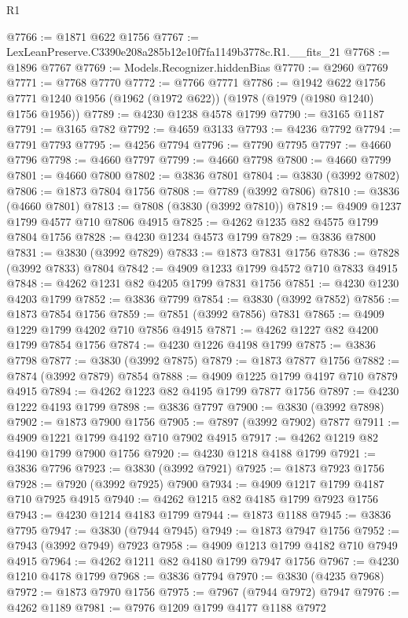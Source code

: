 \begin{lexlean}{R1}
\begin{coremodule}
@7766 := @1871 @622 @1756
@7767 := LexLeanPreserve.C3390e208a285b12e10f7fa1149b3778c.R1.__fits_21
@7768 := @1896 @7767
@7769 := Models.Recognizer.hiddenBias
@7770 := @2960 @7769
@7771 := @7768 @7770
@7772 := @7766 @7771
@7786 := @1942
    @622
    @1756
    @7771
    @1240
    @1956
    (@1962 (@1972 @622))
    (@1978 (@1979 (@1980 @1240) @1756 @1956))
@7789 := @4230 @1238 @4578 @1799
@7790 := @3165 @1187
@7791 := @3165 @782
@7792 := @4659 @3133
@7793 := @4236 @7792
@7794 := @7791 @7793
@7795 := @4256 @7794
@7796 := @7790 @7795
@7797 := @4660 @7796
@7798 := @4660 @7797
@7799 := @4660 @7798
@7800 := @4660 @7799
@7801 := @4660 @7800
@7802 := @3836 @7801
@7804 := @3830 (@3992 @7802)
@7806 := @1873 @7804 @1756
@7808 := @7789 (@3992 @7806)
@7810 := @3836 (@4660 @7801)
@7813 := @7808 (@3830 (@3992 @7810))
@7819 := @4909 @1237 @1799 @4577 @710 @7806 @4915
@7825 := @4262 @1235 @82 @4575 @1799 @7804 @1756
@7828 := @4230 @1234 @4573 @1799
@7829 := @3836 @7800
@7831 := @3830 (@3992 @7829)
@7833 := @1873 @7831 @1756
@7836 := @7828 (@3992 @7833) @7804
@7842 := @4909 @1233 @1799 @4572 @710 @7833 @4915
@7848 := @4262 @1231 @82 @4205 @1799 @7831 @1756
@7851 := @4230 @1230 @4203 @1799
@7852 := @3836 @7799
@7854 := @3830 (@3992 @7852)
@7856 := @1873 @7854 @1756
@7859 := @7851 (@3992 @7856) @7831
@7865 := @4909 @1229 @1799 @4202 @710 @7856 @4915
@7871 := @4262 @1227 @82 @4200 @1799 @7854 @1756
@7874 := @4230 @1226 @4198 @1799
@7875 := @3836 @7798
@7877 := @3830 (@3992 @7875)
@7879 := @1873 @7877 @1756
@7882 := @7874 (@3992 @7879) @7854
@7888 := @4909 @1225 @1799 @4197 @710 @7879 @4915
@7894 := @4262 @1223 @82 @4195 @1799 @7877 @1756
@7897 := @4230 @1222 @4193 @1799
@7898 := @3836 @7797
@7900 := @3830 (@3992 @7898)
@7902 := @1873 @7900 @1756
@7905 := @7897 (@3992 @7902) @7877
@7911 := @4909 @1221 @1799 @4192 @710 @7902 @4915
@7917 := @4262 @1219 @82 @4190 @1799 @7900 @1756
@7920 := @4230 @1218 @4188 @1799
@7921 := @3836 @7796
@7923 := @3830 (@3992 @7921)
@7925 := @1873 @7923 @1756
@7928 := @7920 (@3992 @7925) @7900
@7934 := @4909 @1217 @1799 @4187 @710 @7925 @4915
@7940 := @4262 @1215 @82 @4185 @1799 @7923 @1756
@7943 := @4230 @1214 @4183 @1799
@7944 := @1873 @1188
@7945 := @3836 @7795
@7947 := @3830 (@7944 @7945)
@7949 := @1873 @7947 @1756
@7952 := @7943 (@3992 @7949) @7923
@7958 := @4909 @1213 @1799 @4182 @710 @7949 @4915
@7964 := @4262 @1211 @82 @4180 @1799 @7947 @1756
@7967 := @4230 @1210 @4178 @1799
@7968 := @3836 @7794
@7970 := @3830 (@4235 @7968)
@7972 := @1873 @7970 @1756
@7975 := @7967 (@7944 @7972) @7947
@7976 := @4262 @1189
@7981 := @7976 @1209 @1799 @4177 @1188 @7972

\end{coremodule}
\end{lexlean}
